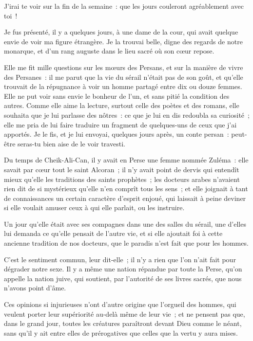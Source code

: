 \documentclass[french,twoside]{book} %
\begin{document}
\noindent J’irai te voir sur la fin de la semaine : que les jours couleront agréablement avec toi !\par
Je fus présenté, il y a quelques jours, à une dame de la cour, qui avait quelque envie de voir ma figure étrangère. Je la trouvai belle, digne des regards de notre monarque, et d’un rang auguste dans le lieu sacré où son cœur repose.\par
Elle me fit mille questions sur les mœurs des Persans, et sur la manière de vivre des Persanes : il me parut que la vie du sérail n’était pas de son goût, et qu’elle trouvait de la répugnance à voir un homme partagé entre dix ou douze femmes. Elle ne put voir sans envie le bonheur de l’un, et sans pitié la condition des autres. Comme elle aime la lecture, surtout celle des poètes et des romans, elle souhaita que je lui parlasse des nôtres : ce que je lui en dis redoubla sa curiosité ; elle me pria de lui faire traduire un fragment de quelques-uns de ceux que j’ai apportés. Je le fis, et je lui envoyai, quelques jours après, un conte persan : peut-être seras-tu bien aise de le voir travesti.\par
Du temps de Cheik-Ali-Can, il y avait en Perse une femme nommée Zuléma : elle savait par cœur tout le saint Alcoran ; il n’y avait point de dervis qui entendît mieux qu’elle les traditions des saints prophètes ; les docteurs arabes n’avaient rien dit de si mystérieux qu’elle n’en comprît tous les sens ; et elle joignait à tant de connaissances un certain caractère d’esprit enjoué, qui laissait à peine deviner si elle voulait amuser ceux à qui elle parlait, ou les instruire.\par
Un jour qu’elle était avec ses compagnes dans une des salles du sérail, une d’elles lui demanda ce qu’elle pensait de l’autre vie, et si elle ajoutait foi à cette ancienne tradition de nos docteurs, que le paradis n’est fait que pour les hommes.\par
C’est le sentiment commun, leur dit-elle ; il n’y a rien que l’on n’ait fait pour dégrader notre sexe. Il y a même une nation répandue par toute la Perse, qu’on appelle la nation juive, qui soutient, par l’autorité de ses livres sacrés, que nous n’avons point d’âme.\par
Ces opinions si injurieuses n’ont d’autre origine que l’orgueil des hommes, qui veulent porter leur supériorité au-delà même de leur vie ; et ne pensent pas que, dans le grand jour, toutes les créatures paraîtront devant Dieu comme le néant, sans qu’il y ait entre elles de prérogatives que celles que la vertu y aura mises.\par
\end{document}
